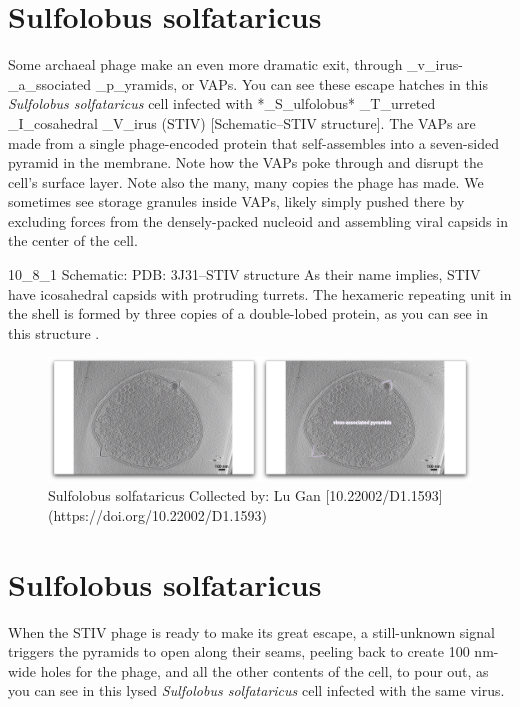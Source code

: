 \documentclass[]{tufte-book}
\begin{document}
\section{Sulfolobus solfataricus}\label{sulfolobus-solfataricus}

Some archaeal phage make an even more dramatic exit, through
\_v\_irus-\_a\_ssociated \_p\_yramids, or VAPs. You can see these escape
hatches in this \emph{Sulfolobus solfataricus} cell infected with
*\_S\_ulfolobus* \_T\_urreted \_I\_cosahedral \_V\_irus (STIV)
{[}Schematic--STIV structure{]}. The VAPs are made from a single
phage-encoded protein that self-assembles into a seven-sided pyramid in
the membrane. Note how the VAPs poke through and disrupt the cell's
surface layer. Note also the many, many copies the phage has made. We
sometimes see storage granules inside VAPs, likely simply pushed there
by excluding forces from the densely-packed nucleoid and assembling
viral capsids in the center of the cell.

10\_8\_1 Schematic: PDB: 3J31--STIV structure As their name implies,
STIV have icosahedral capsids with protruding turrets. The hexameric
repeating unit in the shell is formed by three copies of a double-lobed
protein, as you can see in this structure \citet{veesler2013}.

\begin{figure}
\includegraphics{movie_stills/10_8} \caption[Sulfolobus solfataricus Collected by]{Sulfolobus solfataricus Collected by: Lu Gan [10.22002/D1.1593](https://doi.org/10.22002/D1.1593)}\label{fig:unnamed-chunk-180}
\end{figure}

\section{Sulfolobus solfataricus}\label{sulfolobus-solfataricus-1}

When the STIV phage is ready to make its great escape, a still-unknown
signal triggers the pyramids to open along their seams, peeling back to
create 100 nm-wide holes for the phage, and all the other contents of
the cell, to pour out, as you can see in this lysed \emph{Sulfolobus
solfataricus} cell infected with the same virus.
\end{document}
